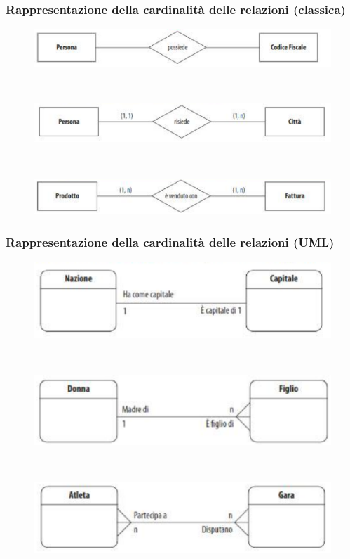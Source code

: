 \documentclass[]{beamer}
\begin{document}
\begin{frame}
\frametitle{Rappresentazione della cardinalità delle relazioni (classica)}
\begin{figure}
  \includegraphics[width=.9\columnwidth]{img/card11std.png}

  ~

  \includegraphics[width=.9\columnwidth]{img/card1nstd.png}

  ~

  \includegraphics[width=.9\columnwidth]{img/cardnnstd.png}
\end{figure}
\end{frame}


\begin{frame}
\frametitle{Rappresentazione della cardinalità delle relazioni (UML)}
\begin{figure}
  \includegraphics[width=.7\columnwidth]{img/card11uml.png}

  ~

  \includegraphics[width=.7\columnwidth]{img/card1numl.png}

  ~

  \includegraphics[width=.7\columnwidth]{img/cardnnuml.png}
\end{figure}
\end{frame}
\end{document}
